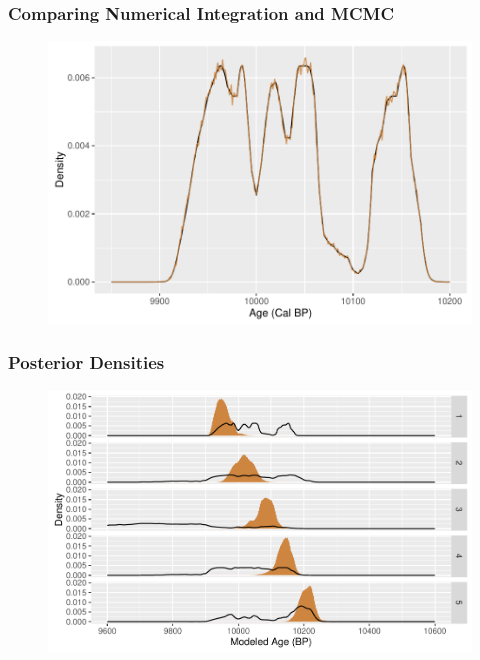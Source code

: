 \documentclass{beamer} %
\begin{document}
\begin{frame}
	\frametitle{Comparing Numerical Integration and MCMC}
	
	\begin{figure}
	\includegraphics[width=\textwidth]{num&mcmc}
	\end{figure}
\end{frame}


\begin{frame}
	\frametitle{Posterior Densities}
	\begin{figure}
	\includegraphics[width=\textwidth]{Fig4Arep}
	\end{figure}
	
\end{frame}


\end{document}
